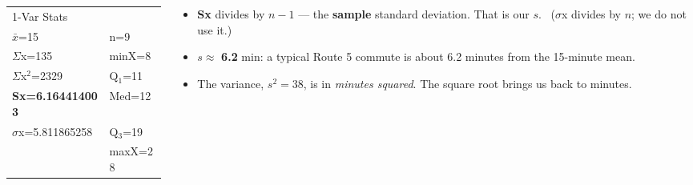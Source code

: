 \documentclass[aspectratio=169, 11pt]{beamer}
\newcommand{\redink}[1]{{\color{redacc}\bfseries #1}}
\begin{document}
\begin{frame}[t, plain]
  \begin{columns}[t]
    \begin{column}{0.44\textwidth}
      \vspace{4pt}
      {\ttfamily\small
      \begin{tabular}{l l}
        1-Var Stats & \\
        $\bar{x}$=15 & n=9 \\
        $\Sigma$x=135 & minX=8 \\
        $\Sigma$x$^2$=2329 & Q$_1$=11 \\
        \textcolor{redacc}{\textbf{Sx=6.164414003}} & Med=12 \\
        $\sigma$x=5.811865258 & Q$_3$=19 \\
         & maxX=28 \\
      \end{tabular}}
    \end{column}
    \begin{column}{0.52\textwidth}
      \begin{itemize}\setlength{\itemsep}{5pt}
        \item \textbf{Sx} divides by $n - 1$ --- the \textbf{sample} standard deviation. That is
              our $s$. \ ($\sigma$x divides by $n$; we do not use it.)
        \item $s \approx$ \redink{6.2} min: a typical Route 5 commute is about 6.2 minutes from
              the 15-minute mean.
        \item The variance, $s^2 = 38$, is in \emph{minutes squared}. The square root brings
              us back to minutes.
      \end{itemize}
    \end{column}
  \end{columns}
\end{frame}
\end{document}
